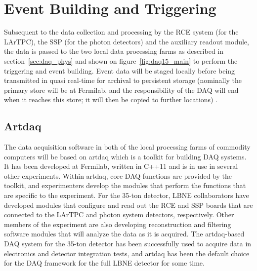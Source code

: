 \section{Event Building and Triggering}
\label{sec:daq_artDAQ}

Subsequent to the data collection and processing by the RCE system
(for the LArTPC), the SSP (for the photon detectors) and the
auxiliary readout module, the data is passed to the two local data
processing farms as described in section~\ref{sec:daq_phys} and shown
on figure~\ref{fig:daq15_main} to perform the triggering and event
building.  Event data will be staged locally before being transmitted
in quasi real-time for archival to persistent storage (nominally the
primary store will be at Fermilab, and the responsibility of the DAQ
will end when it reaches this store; it will then be copied to further
locations) .

\subsection{Artdaq}

The data acquisition software in both of the local processing farms of
commodity computers will be based on artdaq which is a toolkit for
building DAQ systems.  It has been developed at Fermilab, written in
C++11 and is in use in several other experiments.  Within artdaq, core
DAQ functions are provided by the toolkit, and experimenters develop
the modules that perform the functions that are specific to the
experiment.  For the 35-ton detector, LBNE collaborators have
developed modules that configure and read out the RCE and SSP boards
that are connected to the LArTPC and photon system detectors,
respectively.  Other members of the experiment are also developing
reconstruction and filtering software modules that will analyze the
data as it is acquired.  The artdaq-based DAQ system for the 35-ton
detector has been successfully used to acquire data in electronics and
detector integration tests, and artdaq has been the default choice for
the DAQ framework for the full LBNE detector for some time.


